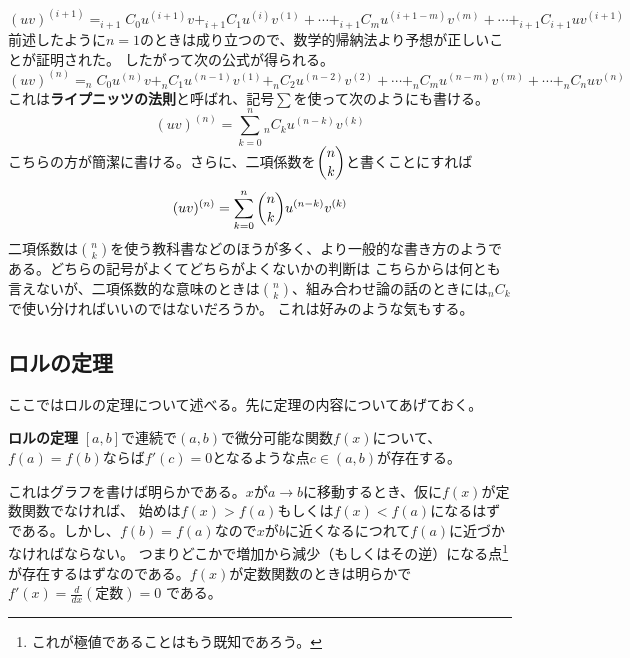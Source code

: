 \documentclass[a4j,dvipdfmx]{jsarticle}
\begin{document}
                    \begin{equation*}
                        (uv)^{(i+1)}=_{i+1}C_0u^{(i+1)}v+_{i+1}C_1u^{(i)}v^{(1)}+\cdots+_{i+1}C_{m}u^{(i+1-m)}v^{(m)}+\cdots+_{i+1}C_{i+1}uv^{(i+1)}                    
                    \end{equation*}
                    前述したように$n=1$のときは成り立つので、数学的帰納法より予想が正しいことが証明された。
                    \clearpage
                    したがって次の公式が得られる。
                    \begin{equation}
                        (uv)^{(n)}=_nC_0u^{(n)}v+_nC_1u^{(n-1)}v^{(1)}+_nC_2u^{(n-2)}v^{(2)}+\cdots + _nC_mu^{(n-m)}v^{(m)}+\cdots+_nC_nuv^{(n)}\label{eq:ライプニッツの公式}
                    \end{equation}
                    これは\textbf{ライプニッツの法則}と呼ばれ、記号$\sum$を使って次のようにも書ける。
                    \begin{equation}
                        (uv)^{(n)}=\sum_{k=0}^{n} {_nC_k}u^{(n-k)}v^{(k)}
                    \end{equation}
                    こちらの方が簡潔に書ける。さらに、二項係数を$\dbinom{n}{k}$と書くことにすれば
                    \begin{equation}
                        (uv)^{(n)}=\sum_{k=0}^{n} \dbinom{n}{k}u^{(n-k)}v^{(k)}
                    \end{equation}
                    二項係数は$\binom{n}{k}$を使う教科書などのほうが多く、より一般的な書き方のようである。どちらの記号がよくてどちらがよくないかの判断は
                    こちらからは何とも言えないが、二項係数的な意味のときは$\binom{n}{k}$、組み合わせ論の話のときには$_nC_k$で使い分ければいいのではないだろうか。
                    これは好みのような気もする。
                \clearpage
                \subsection{ロルの定理}
                    ここではロルの定理について述べる。先に定理の内容についてあげておく。
                    \begin{itembox}{\textbf{ロルの定理}}
                        $[a,b]$で連続で$(a,b)$で微分可能な関数$f(x)$について、$f(a)=f(b)$ならば$f'(c)=0$となるような点$c\in(a,b)$が存在する。
                    \end{itembox}
                    これはグラフを書けば明らかである。$x$が$a\to b$に移動するとき、仮に$f(x)$が定数関数でなければ、
                    始めは$f(x)>f(a)$もしくは$f(x)<f(a)$になるはずである。しかし、$f(b)=f(a)$なので$x$が$b$に近くなるにつれて$f(a)$に近づかなければならない。
                    つまりどこかで増加から減少（もしくはその逆）になる点\footnote{これが極値であることはもう既知であろう。}が存在するはずなのである。$f(x)$が定数関数のときは明らかで$f'(x)=\frac{d}{dx}(\text{定数})=0$
                    である。
\end{document}

